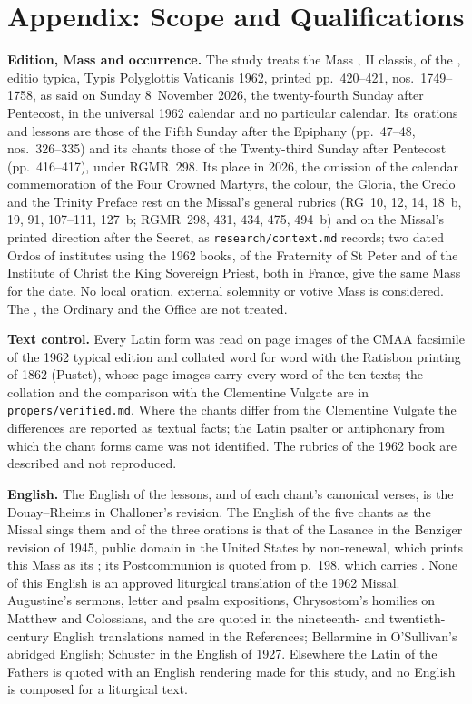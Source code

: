 \section{Appendix: Scope and Qualifications}
\label{sec:scope}

{\small
\textbf{Edition, Mass and occurrence.} The study treats the Mass
, II classis, of the
, editio typica, Typis Polyglottis Vaticanis 1962,
printed pp.~420--421, nos.~1749--1758, as said on Sunday 8~November 2026, the
twenty-fourth Sunday after Pentecost, in the universal 1962 calendar and no
particular calendar. Its orations and lessons are those of the Fifth Sunday
after the Epiphany (pp.~47--48, nos.~326--335) and its chants those of the
Twenty-third Sunday after Pentecost (pp.~416--417), under RGMR~298. Its place
in 2026, the omission of the calendar commemoration of the Four Crowned
Martyrs, the colour, the Gloria, the Credo and the Trinity Preface rest on
the Missal's general rubrics (RG~10, 12, 14, 18~b, 19, 91, 107--111, 127~b;
RGMR~298, 431, 434, 475, 494~b) and on the Missal's printed direction after
the Secret, as \texttt{research/context.md} records; two dated Ordos of
institutes using the 1962 books, of the Fraternity of St Peter and of the
Institute of Christ the King Sovereign Priest, both in France, give the same
Mass for the date. No local oration, external solemnity or votive Mass is
considered. The , the Ordinary and the Office are not treated.

\textbf{Text control.} Every Latin form was read on page images of the CMAA
facsimile of the 1962 typical edition and collated word for word with the
Ratisbon printing of 1862 (Pustet), whose page images carry every word of the
ten texts; the collation and the comparison with the Clementine Vulgate are in
\texttt{propers/verified.md}. Where the chants differ from the Clementine
Vulgate the differences are reported as textual facts; the Latin psalter or
antiphonary from which the chant forms came was not identified. The rubrics
of the 1962 book are described and not reproduced.

\textbf{English.} The English of the lessons, and of each chant's canonical
verses, is the Douay--Rheims in Challoner's revision. The English of the five
chants as the Missal sings them and of the three orations is that of the
Lasance  in the Benziger revision of 1945, public domain
in the United States by non-renewal, which prints this Mass as its
; its Postcommunion is quoted from p.~198,
which carries . None of this English is an approved
liturgical translation of the 1962 Missal. Augustine's sermons, letter and
psalm expositions, Chrysostom's homilies on Matthew and Colossians, and the
 are quoted in the nineteenth- and twentieth-century English
translations named in the References; Bellarmine in O'Sullivan's abridged
English; Schuster in the English of 1927. Elsewhere the Latin of the Fathers
is quoted with an English rendering made for this study, and no English is
composed for a liturgical text.

}
